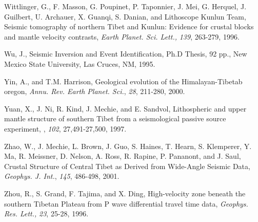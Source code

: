\documentclass[12pt]{article}
\begin{document}
\begin{references}
Wittlinger, G., F. Masson, G. Poupinet, P. Taponnier, J. Mei, G. Herquel,
J. Guilbert, U. Archauer, X. Guanqi, S. Danian, and Lithoscope Kunlun Team,
Seismic tomography of northern Tibet and Kunlun: Evidence for crustal blocks
and mantle velocity contrasts, {\it Earth Planet. Sci. Lett.,} {\it 139},
263-279, 1996.

Wu, J., Seismic Inversion and Event Identification, Ph.D Thesis, 92 pp.,
New Mexico State University, Las Cruces, NM, 1995.

Yin, A., and T.M. Harrison, Geological evolution of the
Himalayan-Tibetab oregon, {\it Annu. Rev. Earth Planet. Sci.}, {\it 28}, 211-280,
2000.

Yuan, X., J. Ni, R. Kind, J. Mechie, and E. Sandvol, Lithospheric
and upper mantle structure of southern Tibet from a seismological passive
source experiment, \jgr, {\it 102}, 27,491-27,500, 1997.

Zhao, W., J. Mechie, L. Brown, J. Guo, S. Haines, T. Hearn, S. Klemperer,
Y. Ma, R. Meissner, D. Nelson, A. Ross, R. Rapine, P. Pananont, and J. Saul,
Crustal Structure of Central Tibet as Derived from Wide-Angle
Seismic Data, {\it Geophys. J. Int.}, {\it 145}, 486-498, 2001.

Zhou, R., S. Grand, F. Tajima, and X. Ding, High-velocity zone
beneath the southern Tibetan Plateau from P wave differential travel time data,
{\it Geophys. Res. Lett.,} {\it 23}, 25-28, 1996.

\end{references}

\clearpage
\end{document}
